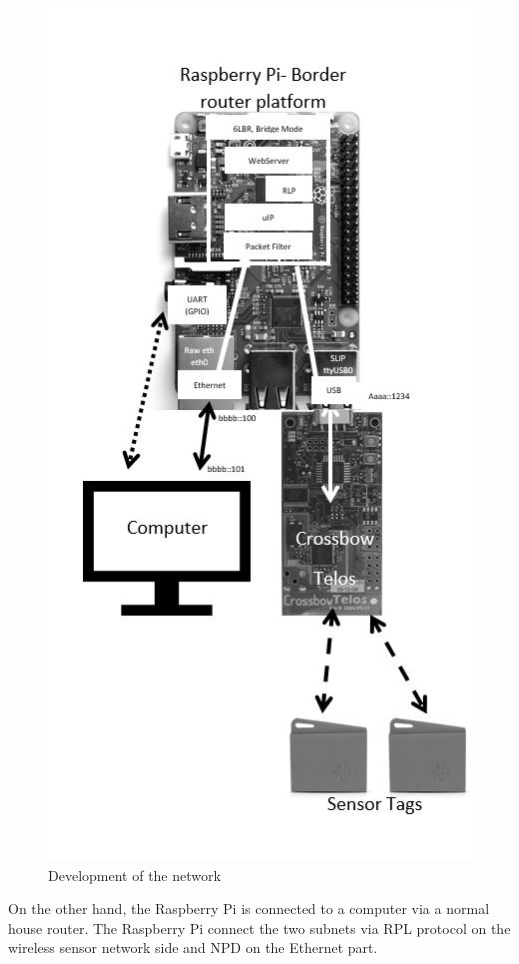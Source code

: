 \begin{figure}[!h]
	\includegraphics[width=\linewidth]{Network}
	\caption{Development of the network}
	\label{fig:Network}
\end{figure}
On the other hand, the Raspberry Pi is connected to a computer via a normal house router.
The Raspberry Pi connect the two subnets via RPL protocol on the wireless sensor network side and NPD on the Ethernet part.\\


